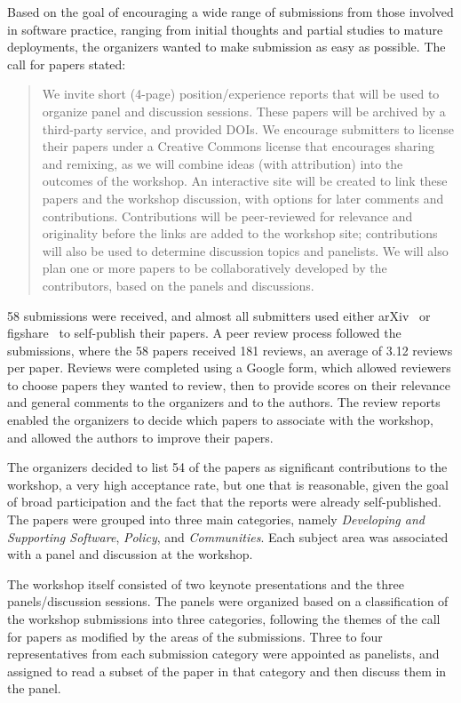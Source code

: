 \documentclass[11pt, oneside]{amsart}
\begin{document}
Based on the goal of encouraging a wide range of submissions from
those involved in software practice, ranging from initial thoughts and
partial studies to mature deployments, the organizers wanted to make
submission as easy as possible. The call for papers stated:

\begin{quote}
We invite short (4-page) position/experience reports that will be used
to organize panel and discussion sessions. These papers will be
archived by a third-party service, and provided DOIs. We encourage
submitters to license their papers under a Creative Commons license
that encourages sharing and remixing, as we will combine ideas (with
attribution) into the outcomes of the workshop.  An interactive site
will be created to link these papers and the workshop discussion, with
options for later comments and contributions. Contributions will be
peer-reviewed for relevance and originality before the links are added
to the workshop site; contributions will also be used to determine
discussion topics and panelists. We will also plan one or more papers
to be collaboratively developed by the contributors, based on the
panels and discussions.
\end{quote}

58 submissions were received, and almost all submitters used either
arXiv~\cite{arXiv-web} or figshare~\cite{figshare-web} to self-publish
their papers.  A peer review process followed the submissions, where
the 58 papers received 181 reviews, an average of 3.12 reviews per
paper. Reviews were completed using a Google form, which allowed
reviewers to choose papers they wanted to review, then to provide
scores on their relevance and general comments to the organizers and
to the authors. The review reports enabled the organizers to decide
which papers to associate with the workshop, and allowed the authors
to improve their papers.

The organizers decided to list 54 of the papers as significant
contributions to the workshop, a very high acceptance rate, but one
that is reasonable, given the goal of broad participation and the fact
that the reports were already self-published. The papers were
grouped into three main categories, namely \emph{Developing and
  Supporting Software}, \emph{Policy}, and \emph{Communities}. Each
subject area was associated with a panel and discussion at the
workshop.

The workshop itself consisted of two keynote presentations and the
three panels/discussion sessions. The panels were organized based on a
classification of the workshop submissions into three categories,
following the themes of the call for papers as modified by the areas
of the submissions. Three to four representatives from each submission
category were appointed as panelists, and assigned to read a subset of
the paper in that category and then discuss them in the panel.
\end{document}
